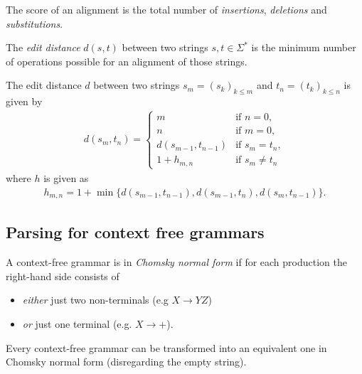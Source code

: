 \documentclass{article}
\begin{document}
\begin{definition}
	The score of an alignment is the total number of \emph{insertions},
	\emph{deletions} and \emph{substitutions}.
\end{definition}

\begin{definition}
	The \emph{edit distance} $d(s,t)$ between two strings $s,t\in\Sigma^*$ is the
	minimum number of operations possible for an alignment of those strings.
\end{definition}

\begin{theorem}
	The edit distance $d$ between two strings $s_m=(s_k)_{k\leq m}$ 
	and $t_n=(t_k)_{k\leq n}$ is given by 
	\begin{align*}
		d(s_m,t_n) = \begin{cases}
			m &\text{if }n=0,\\
			n &\text{if }m=0,\\
			d(s_{m-1}, t_{n-1}) &\text{if }s_m=t_n,\\
			1 + h_{m,n} &\text{if }s_m\not=t_n
		\end{cases}
	\end{align*}
	where $h$ is given as
	\begin{align*}
		h_{m,n}= 1 + \min\{d(s_{m-1},t_{n-1}), d(s_{m-1}, t_n), d(s_m, t_{n-1})\}.	
	\end{align*}
\end{theorem}

\subsection{Parsing for context free grammars}

\begin{definition}
	A context-free grammar is in \emph{Chomsky normal form} if for
	each production the right-hand side consists of
	\begin{itemize}
		\item \emph{either} just two non-terminals (e.g $X\to YZ$)
		\item \emph{or} just one terminal (e.g. $X\to +$).
	\end{itemize}
\end{definition}

\begin{lemma}
	Every context-free grammar can be transformed into an
	equivalent one in Chomsky normal form (disregarding
	the empty string).
\end{lemma}
\end{document}

